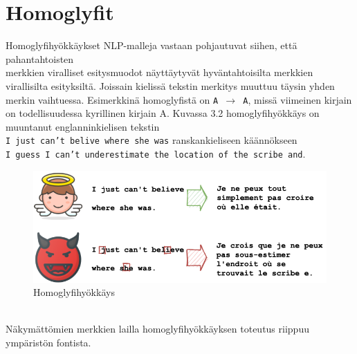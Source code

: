 \section{Homoglyfit}
Homoglyfihyökkäykset NLP-malleja vastaan pohjautuvat siihen, että pahantahtoisten\\ merkkien viralliset esitysmuodot näyttäytyvät hyväntahtoisilta merkkien virallisilta esityksiltä. Jois\-sain kielissä tekstin merkitys muuttuu täysin yhden merkin vaihtuessa. Esimerkkinä homoglyfistä on \texttt{A $\rightarrow$ A}, missä viimeinen kirjain on todellisuudessa kyrillinen kirjain A. Kuvassa 3.2 homoglyfihyökkäys on muuntanut englanninkielisen tekstin\\ \texttt{I just can't belive where she was} ranskankieliseen käännökseen\\ \texttt{I guess I can't underestimate the location of the scribe and}.
\begin{figure}[hbt]
  \includegraphics[scale=0.599]{figures/homoglyph.png}
  \caption{Homoglyfihyökkäys \citep{boucher2021bad}}
\end{figure}
\\Näkymättömien merkkien lailla homoglyfihyökkäyksen toteutus riippuu ympäristön fontista. \citep{boucher2021bad}

